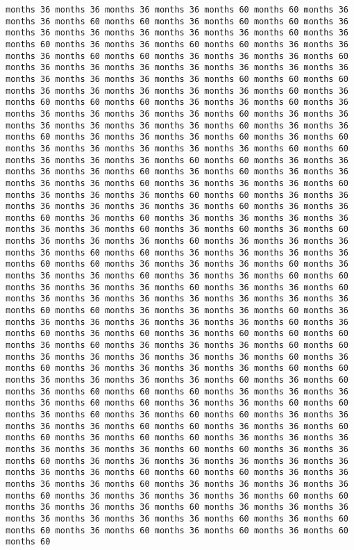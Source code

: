 \documentclass[11pt]{article}
\begin{document}
\begin{Verbatim}[commandchars=\\\{\}, frame=single, framerule=2mm, rulecolor=\color{outerrorbackground}]
months 36 months 36 months 36 months 36 months 60 months 60 months 36 months 36 months 60 months 60 months 36 months 60 months 60 months 36 months 36 months 36 months 36 months 36 months 36 months 60 months 36 months 60 months 36 months 36 months 60 months 60 months 36 months 36 months 36 months 60 months 60 months 36 months 36 months 36 months 60 months 36 months 36 months 36 months 36 months 36 months 36 months 36 months 36 months 36 months 36 months 36 months 60 months 60 months 60 months 36 months 36 months 36 months 36 months 36 months 60 months 36 months 60 months 60 months 60 months 36 months 36 months 60 months 36 months 36 months 36 months 36 months 36 months 60 months 36 months 36 months 36 months 36 months 36 months 36 months 60 months 36 months 36 months 60 months 36 months 36 months 36 months 60 months 36 months 60 months 36 months 36 months 36 months 36 months 36 months 60 months 60 months 36 months 36 months 36 months 60 months 60 months 36 months 36 months 36 months 36 months 60 months 36 months 60 months 36 months 36 months 36 months 36 months 60 months 36 months 36 months 36 months 60 months 36 months 36 months 36 months 60 months 60 months 36 months 36 months 36 months 36 months 36 months 36 months 60 months 36 months 36 months 60 months 36 months 60 months 36 months 36 months 36 months 36 months 36 months 36 months 60 months 36 months 60 months 36 months 60 months 36 months 36 months 36 months 60 months 36 months 36 months 36 months 36 months 60 months 60 months 36 months 36 months 36 months 36 months 60 months 60 months 36 months 36 months 36 months 60 months 36 months 36 months 36 months 60 months 36 months 36 months 60 months 60 months 36 months 36 months 36 months 60 months 36 months 36 months 60 months 36 months 36 months 36 months 36 months 36 months 36 months 36 months 60 months 60 months 36 months 36 months 36 months 60 months 36 months 36 months 36 months 36 months 36 months 36 months 60 months 36 months 60 months 36 months 60 months 36 months 60 months 60 months 60 months 36 months 60 months 36 months 36 months 36 months 60 months 60 months 36 months 36 months 36 months 36 months 36 months 60 months 36 months 60 months 36 months 36 months 36 months 36 months 60 months 60 months 36 months 36 months 36 months 36 months 60 months 36 months 60 months 36 months 60 months 60 months 60 months 36 months 36 months 36 months 36 months 60 months 60 months 36 months 36 months 60 months 60 months 36 months 60 months 36 months 60 months 60 months 36 months 36 months 36 months 36 months 60 months 60 months 36 months 36 months 60 months 60 months 36 months 60 months 60 months 36 months 36 months 36 months 36 months 36 months 36 months 60 months 60 months 36 months 36 months 60 months 36 months 36 months 36 months 36 months 36 months 36 months 36 months 36 months 60 months 60 months 60 months 36 months 36 months 36 months 36 months 60 months 36 months 36 months 36 months 36 months 60 months 36 months 36 months 36 months 36 months 60 months 60 months 36 months 36 months 36 months 60 months 36 months 36 months 36 months 36 months 36 months 36 months 36 months 60 months 36 months 60 months 60 months 36 months 60 months 36 months 60 months 36 months 60 months 60 
\end{Verbatim}
\end{document}
